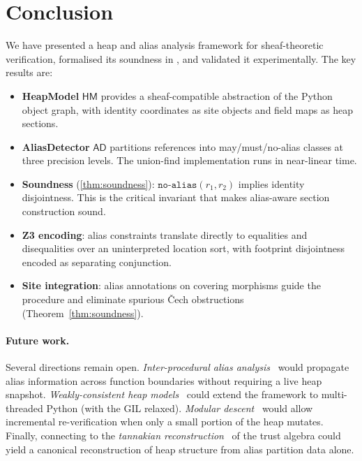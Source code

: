 \documentclass[11pt]{article}
\newcommand{\NoAlias}{\ensuremath{\mathtt{no\text{-}alias}}}     %
\newcommand{\AD}{\mathsf{AD}}               %
\newcommand{\HM}{\mathsf{HM}}               %
\begin{document}
\section{Conclusion}
\label{sec:conclusion}

We have presented a heap and alias analysis framework for sheaf-theoretic
\Python{} verification, formalised its soundness in \LEAN{}, and
validated it experimentally.  The key results are:

\begin{itemize}[noitemsep]
  \item \textbf{HeapModel} $\HM$ provides a sheaf-compatible abstraction
    of the Python object graph, with identity coordinates as site
    objects and field maps as heap sections.
  \item \textbf{AliasDetector} $\AD$ partitions references into
    may/must/no-alias classes at three precision levels.  The union-find
    implementation runs in near-linear time.
  \item \textbf{Soundness} (\cref{thm:soundness}): $\NoAlias(r_1,r_2)$
    implies identity disjointness.  This is the critical invariant that
    makes alias-aware section construction sound.
  \item \textbf{Z3 encoding}: alias constraints translate directly to
    equalities and disequalities over an uninterpreted location sort,
    with footprint disjointness encoded as separating conjunction.
  \item \textbf{Site integration}: alias annotations on covering
    morphisms guide the \GLUE{} procedure and eliminate
    spurious Čech obstructions (Theorem~\ref{thm:soundness}).
\end{itemize}

\paragraph{Future work.}
Several directions remain open.  \emph{Inter-procedural alias
analysis}~\cite{andersen1994program} would propagate alias information
across function boundaries without requiring a live heap snapshot.
\emph{Weakly-consistent heap models}~\cite{brookes2016concurrent} could
extend the framework to multi-threaded Python (with the GIL relaxed).
\emph{Modular descent}~\cite{paper03} would allow incremental
re-verification when only a small portion of the heap mutates.  Finally,
connecting to the \emph{tannakian reconstruction}~\cite{paper15} of the
trust algebra could yield a canonical reconstruction of heap structure
from alias partition data alone.
\end{document}

